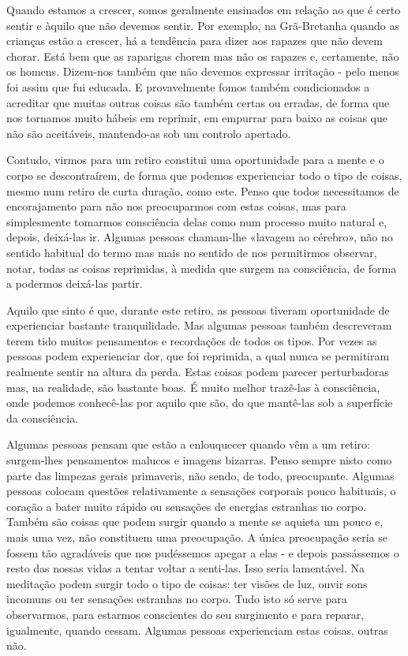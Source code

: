 Quando estamos a crescer, somos geralmente ensinados em relação ao que é
certo sentir e àquilo que não devemos sentir. Por exemplo, na
Grã-Bretanha quando as crianças estão a crescer, há a tendência para
dizer aos rapazes que não devem chorar. Está bem que as raparigas chorem
mas não os rapazes e, certamente, não os homens. Dizem-nos também que
não devemos expressar irritação - pelo menos foi assim que fui educada.
E provavelmente fomos também condicionados a acreditar que muitas outras
coisas são também certas ou erradas, de forma que nos tornamos muito
hábeis em reprimir, em empurrar para baixo as coisas que não são
aceitáveis, mantendo-as sob um controlo apertado.

Contudo, virmos para um retiro constitui uma oportunidade para a mente e
o corpo se descontraírem, de forma que podemos experienciar todo o tipo
de coisas, mesmo num retiro de curta duração, como este. Penso que todos
necessitamos de encorajamento para não nos preocuparmos com estas
coisas, mas para simplesmente tomarmos consciência delas como num
processo muito natural e, depois, deixá-las ir. Algumas pessoas
chamam-lhe «lavagem ao cérebro», não no sentido habitual do termo mas
mais no sentido de nos permitirmos observar, notar, todas as coisas
reprimidas, à medida que surgem na consciência, de forma a podermos
deixá-las partir.

Aquilo que sinto é que, durante este retiro, as pessoas tiveram
oportunidade de experienciar bastante tranquilidade. Mas algumas pessoas
também descreveram terem tido muitos pensamentos e recordações de todos
os tipos. Por vezes as pessoas podem experienciar dor, que foi
reprimida, a qual nunca se permitiram realmente sentir na altura da
perda. Estas coisas podem parecer perturbadoras mas, na realidade, são
bastante boas. É muito melhor trazê-las à consciência, onde podemos
conhecê-las por aquilo que são, do que mantê-las sob a superfície da
consciência.

Algumas pessoas pensam que estão a enlouquecer quando vêm a um retiro:
surgem-lhes pensamentos malucos e imagens bizarras. Penso sempre nisto
como parte das limpezas gerais primaveris, não sendo, de todo,
preocupante. Algumas pessoas colocam questões relativamente a sensações
corporais pouco habituais, o coração a bater muito rápido ou sensações
de energias estranhas no corpo. Também são coisas que podem surgir
quando a mente se aquieta um pouco e, mais uma vez, não constituem uma
preocupação. A única preocupação seria se fossem tão agradáveis que nos
pudéssemos apegar a elas - e depois passássemos o resto das nossas vidas
a tentar voltar a senti-las. Isso seria lamentável. Na meditação podem
surgir todo o tipo de coisas: ter visões de luz, ouvir sons incomuns ou
ter sensações estranhas no corpo. Tudo isto só serve para observarmos,
para estarmos conscientes do seu surgimento e para reparar, igualmente,
quando cessam. Algumas pessoas experienciam estas coisas, outras não.

